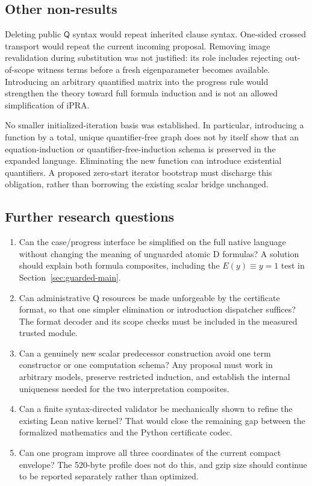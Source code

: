 \documentclass[11pt,letterpaper]{article}
\theoremstyle{definition}\newtheorem{definition}[theorem]{Definition}
\theoremstyle{remark}\newtheorem{remark}[theorem]{Remark}
\newcommand{\Q}{\mathsf Q}
\begin{document}
\subsection{Other non-results}

Deleting public $\Q$ syntax would repeat inherited clause syntax.
One-sided crossed transport would repeat the current incoming proposal.
Removing image revalidation during substitution was not justified:
its role includes rejecting out-of-scope witness terms before a fresh
eigenparameter becomes available. Introducing an arbitrary quantified
matrix into the progress rule would strengthen the theory toward full
formula induction and is not an allowed simplification of iPRA.

No smaller initialized-iteration basis was established. In particular,
introducing a function by a total, unique quantifier-free graph does not
by itself show that an equation-induction or quantifier-free-induction
schema is preserved in the expanded language. Eliminating the new
function can introduce existential quantifiers. A proposed zero-start
iterator bootstrap must discharge this obligation, rather than borrowing
the existing scalar bridge unchanged.

\subsection{Further research questions}

\begin{enumerate}
\item Can the case/progress interface be simplified on the full native
language without changing the meaning of unguarded atomic D formulas?
A solution should explain both formula composites, including the
$E(y)\equiv y=1$ test in Section~\ref{sec:guarded-main}.
\item Can administrative Q resources be made unforgeable by the
certificate format, so that one simpler elimination or introduction
dispatcher suffices? The format decoder and its scope checks must be
included in the measured trusted module.
\item Can a genuinely new scalar predecessor construction avoid one
term constructor or one computation schema? Any proposal must work in
arbitrary models, preserve restricted induction, and establish the
internal uniqueness needed for the two interpretation composites.
\item Can a finite syntax-directed validator be mechanically shown to
refine the existing Lean native kernel? That would close the remaining
gap between the formalized mathematics and the Python certificate codec.
\item Can one program improve all three coordinates of the current
compact envelope? The 520-byte profile does not do this, and gzip size
should continue to be reported separately rather than optimized.
\end{enumerate}
\end{document}
